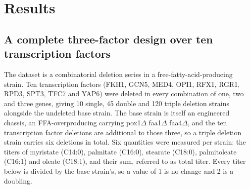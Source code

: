 
\section{Results}

\subsection*{A complete three-factor design over ten transcription factors}

The dataset is a combinatorial deletion series in a free-fatty-acid-producing
 strain. Ten transcription factors (FKH1, GCN5, MED4, OPI1, RFX1, RGR1,
RPD3, SPT3, TFC7 and YAP6) were deleted in every combination of one, two and three genes,
giving 10 single, 45 double and 120 triple deletion strains alongside the undeleted base
strain. The base strain is itself an engineered chassis, an FFA-overproducing
 carrying pox1$\Delta$ faa1$\Delta$ faa4$\Delta$, and the ten
transcription factor deletions are additional to those three, so a triple deletion strain
carries six deletions in total. Six quantities were measured per strain: the titers of
myristate (C14:0), palmitate (C16:0), stearate (C18:0), palmitoleate (C16:1) and oleate
(C18:1), and their sum, referred to as total titer. Every titer below is divided by the
base strain's, so a value of 1 is no change and 2 is a doubling.

